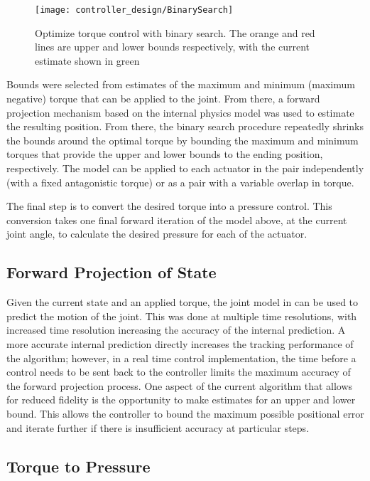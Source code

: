 \begin{figure}
\centering
\texttt{[image: controller\_design/BinarySearch]}
\caption{Optimize torque control with binary search. The orange and red lines are upper and lower bounds respectively, with the current estimate shown in green}
\label{fig:BinarySearch}
\end{figure}

Bounds were selected from estimates
of the maximum and minimum (maximum negative) torque that can be applied to the
joint. From there, a forward projection mechanism based on the internal physics model was
used to estimate the resulting position. From there, the binary search procedure
repeatedly shrinks the bounds around the optimal torque by bounding the maximum and minimum torques that provide the upper and lower bounds to the ending position, respectively. The model can be 
applied to each actuator in the pair independently (with a fixed antagonistic 
torque) or as a pair with a variable overlap in torque. 

The final
step is to convert the desired torque into a pressure control. This conversion takes
one final forward iteration of the model above, at the current joint angle, to 
calculate the desired pressure for each of the actuator.

\subsection{Forward Projection of State}

Given the current state and an applied torque, the joint model in 
 can be used to predict the motion of the joint.
This was done at multiple time resolutions, with increased time resolution 
increasing the accuracy of the internal prediction. A more accurate internal prediction directly increases the tracking
performance of the algorithm; however, in a real time control implementation, the time before a control needs to be sent back to the controller limits the maximum accuracy of the forward projection process. One aspect of the current algorithm that allows for reduced fidelity is the 
opportunity to make estimates for an upper and lower bound. This allows the 
controller to bound the maximum possible positional error and iterate further
if there is insufficient accuracy at particular steps.

\subsection{Torque to Pressure}

